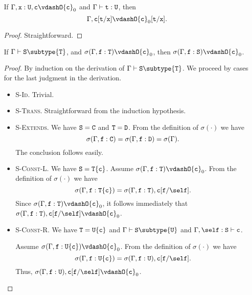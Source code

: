 \begin{lemma}
\label{subst-in-assumption}
If   $\Gamma, {\tt x}: {\tt U}, {\tt c} \vdashO {\tt c}_0$
and  $\Gamma \vdash {\tt t}: {\tt U}$,
then $$\Gamma, {\tt c}[{\tt t}/{\tt x}] \vdashO {\tt c}_0[{\tt t}/{\tt x}].$$
\end{lemma}

\begin{proof}
Straightforward.
\end{proof}

\begin{lemma}
\label{constraint-lemma} %
If   $\Gamma \vdash {\tt S} \subtype {\tt T}$,
and  $\sigma(\Gamma,{\tt f}: {\tt T}) \vdashO {\tt c}_0$,
then $\sigma(\Gamma,{\tt f}: {\tt S}) \vdashO {\tt c}_0$.
\end{lemma}

\begin{proof}
By induction on the derivation of 
     $\Gamma \vdash {\tt S} \subtype {\tt T}$.
We proceed by cases for the last judgment in the derivation.
\begin{itemize}
\item \textsc{S-Id}.
Trivial.
\item \textsc{S-Trans}.
Straightforward from the induction hypothesis.
\item \textsc{S-Extends}.
We have
${\tt S} = {\tt C}$ and ${\tt T} = {\tt D}$.
From the definition of $\sigma(\cdot)$ we have
    $$\sigma(\Gamma,{\tt f}: {\tt C}) =
    \sigma(\Gamma,{\tt f}: {\tt D}) = \sigma(\Gamma).$$
The conclusion follows easily.

\item \textsc{S-Const-L}.
We have
${\tt S} = {\tt T\{c\}}$.
Assume
$\sigma(\Gamma,{\tt f}: {\tt T}) \vdashO {\tt c}_0$.
From the definition of $\sigma(\cdot)$ we have
    $$\sigma(\Gamma,{\tt f}: {\tt T\{c\}}) = 
      \sigma(\Gamma, {\tt f}: {\tt T}), {\tt c}[{\tt f}/\self].$$
Since
$\sigma(\Gamma,{\tt f}: {\tt T}) \vdashO {\tt c}_0$, it follows immediately that
$\sigma(\Gamma,{\tt f}: {\tt T}), {\tt c}[{\tt f}/\self] \vdashO {\tt c}_0$.

\item \textsc{S-Const-R}.
We have
${\tt T} = {\tt U\{c\}}$ and $\Gamma \vdash {\tt S} \subtype {\tt U}$
and $\Gamma, \self: {\tt S} \vdash {\tt c}$.

Assume
$\sigma(\Gamma,{\tt f}: {\tt U\{c\}}) \vdashO {\tt c}_0$.
From the definition of $\sigma(\cdot)$ we have
    $$\sigma(\Gamma,{\tt f}: {\tt U\{c\}}) = 
      \sigma(\Gamma, {\tt f}: {\tt U}), {\tt c}[{\tt f}/\self].$$
Thus,
    $\sigma(\Gamma, {\tt f}: {\tt U}), {\tt c}[{\tt f}/\self] \vdashO {\tt c}_0$.


\end{itemize}
\end{proof}
